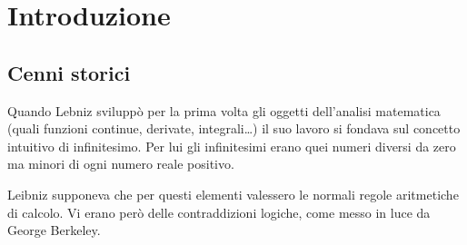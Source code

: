 \chapter*{Introduzione}






\section*{Cenni storici}

Quando Lebniz sviluppò per la prima volta gli oggetti dell'analisi matematica (quali funzioni continue, derivate, integrali\dots) il suo lavoro si fondava sul concetto intuitivo di infinitesimo. Per lui gli infinitesimi erano quei numeri diversi da zero ma minori di ogni numero reale positivo.

Leibniz supponeva che per questi elementi valessero le normali regole aritmetiche di calcolo. Vi erano però delle contraddizioni logiche, come messo in luce da George Berkeley. 

